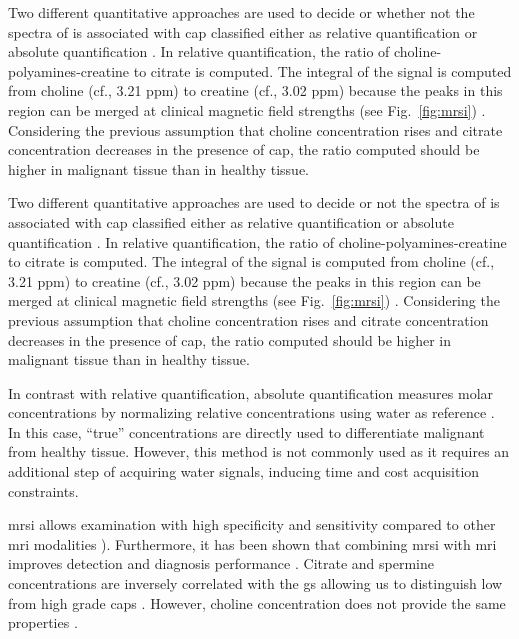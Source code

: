 Two different quantitative approaches are used to decide or whether not the spectra of  is associated with \ac{cap} classified either as relative quantification or absolute quantification \cite{Lemaitre2011}.
In relative quantification, the ratio of choline-polyamines-creatine to citrate is computed.
The integral of the signal is computed from choline (cf., 3.21 ppm) to creatine (cf., 3.02 ppm) because the peaks in this region can be merged at clinical magnetic field strengths (see Fig.~\ref{fig:mrsi}) \cite{Hoeks2011,Graaf2000}.
Considering the previous assumption that choline concentration rises and citrate concentration decreases in the presence of \ac{cap}, the ratio computed should be higher in malignant tissue than in healthy tissue. 

Two different quantitative approaches are used to decide or not the spectra of  is associated with \ac{cap} classified either as relative quantification or absolute quantification \cite{Lemaitre2011}.
In relative quantification, the ratio of choline-polyamines-creatine to citrate is computed.
The integral of the signal is computed from choline (cf., 3.21 ppm) to creatine (cf., 3.02 ppm) because the peaks in this region can be merged at clinical magnetic field strengths (see Fig.~\ref{fig:mrsi}) \cite{Hoeks2011,Graaf2000}.
Considering the previous assumption that choline concentration rises and citrate concentration decreases in the presence of \ac{cap}, the ratio computed should be higher in malignant tissue than in healthy tissue. 

In contrast with relative quantification, absolute quantification measures molar concentrations by normalizing relative concentrations using water as reference \cite{Lemaitre2011}.
In this case, ``true'' concentrations are directly used to differentiate malignant from healthy tissue.
However, this method is not commonly used as it requires an additional step of acquiring water signals, inducing time and cost acquisition constraints.

\ac{mrsi} allows examination with high specificity and sensitivity compared to other \ac{mri} modalities \cite{Choi2007}).
Furthermore, it has been shown that combining \ac{mrsi} with \ac{mri} improves detection and diagnosis performance \cite{Scheidler1999a,Kaji1998,Vilanova2009}.
Citrate and spermine concentrations are inversely correlated with the \ac{gs} allowing us to distinguish low from high grade \acp{cap} \cite{Giskeodegard2013}.
However, choline concentration does not provide the same properties \cite{Giskeodegard2013}.

